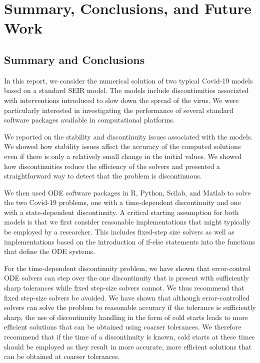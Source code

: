 \section{Summary, Conclusions, and Future Work}
\label{section:summary}
\subsection{Summary and Conclusions}
In this report, we consider the numerical solution of two typical Covid-19 models based on a standard SEIR model. The models include discontinuities associated with interventions introduced to slow down the spread of the virus. We were particularly interested in investigating the performance of several standard software packages available in computational platforms.

We reported on the stability and discontinuity issues associated with the models. We showed how stability issues affect the accuracy of the computed solutions even if there is only a relatively small change in the initial values. We showed how discontinuities reduce the efficiency of the solvers and presented a straightforward way to detect that the problem is discontinuous.

We then used ODE software packages in R, Python, Scilab, and Matlab to solve the two Covid-19 problems, one with a time-dependent discontinuity and one with a state-dependent discontinuity. A critical starting assumption for both models is that we first consider reasonable implementations that might typically be employed by a researcher. This includes fixed-step size solvers as well as implementations based on the introduction of if-else statements into the functions that define the ODE systems. 

For the time-dependent discontinuity problem, we have shown that error-control ODE solvers can step over the one discontinuity that is present with sufficiently sharp tolerances while fixed step-size solvers cannot. We thus recommend that fixed step-size solvers be avoided. We have shown that although error-controlled solvers can solve the problem to reasonable accuracy if the tolerance is sufficiently sharp, the use of discontinuity handling in the form of cold starts leads to more efficient solutions that can be obtained using coarser tolerances. We therefore recommend that if the time of a discontinuity is known, cold starts at these times should be employed as they result in more accurate, more efficient solutions that can be obtained at coarser tolerances.

